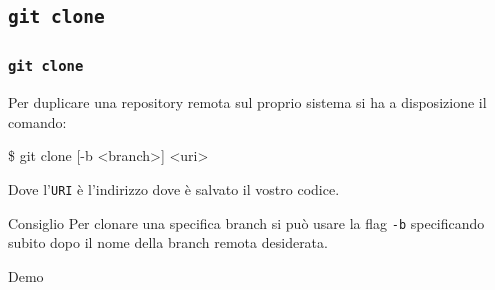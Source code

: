 \documentclass{beamer}
\begin{document}
\subsection{\texttt{git clone}}
\begin{frame}
  \frametitle{\texttt{git clone}}
  Per duplicare una repository remota sul proprio sistema si ha a disposizione
  il comando:
  \begin{semiverbatim}
  \$ git clone [-b <branch>] <uri>
  \end{semiverbatim}
  Dove l'\texttt{URI} \`e l'indirizzo dove \`e salvato il vostro codice.
  \pause
  \begin{block}{Consiglio}
    Per clonare una specifica branch si pu\`o usare la flag \texttt{-b}
    specificando subito dopo il nome della branch remota desiderata.
  \end{block}
\end{frame}

\begin{frame}[c]
  \centering
  Demo
\end{frame}
\end{document}

